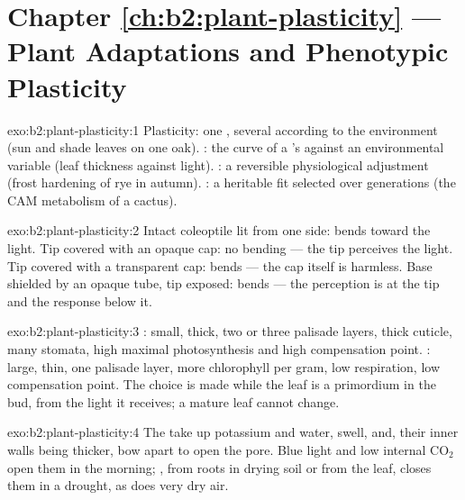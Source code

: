 \section*{Chapter \ref{ch:b2:plant-plasticity} --- Plant Adaptations and Phenotypic Plasticity}

\begin{solution}{exo:b2:plant-plasticity:1}
Plasticity: one , several  according to the
environment (sun and shade leaves on one oak). :
the curve of a 's  against an environmental
variable (leaf thickness against light). : a reversible
physiological adjustment (frost hardening of rye in autumn).
: a heritable fit selected over generations (the CAM
metabolism of a cactus).
\end{solution}

\begin{solution}{exo:b2:plant-plasticity:2}
Intact coleoptile lit from one side: bends toward the light. Tip
covered with an opaque cap: no bending --- the tip perceives the
light. Tip covered with a transparent cap: bends --- the cap itself
is harmless. Base shielded by an opaque tube, tip exposed: bends ---
the perception is at the tip and the response below it.
\end{solution}

\begin{solution}{exo:b2:plant-plasticity:3}
: small, thick, two or three palisade layers, thick
cuticle, many stomata, high maximal photosynthesis and high
compensation point. : large, thin, one palisade layer,
more chlorophyll per gram, low respiration, low compensation point.
The choice is made while the leaf is a primordium in the bud, from
the light it receives; a mature leaf cannot change.
\end{solution}

\begin{solution}{exo:b2:plant-plasticity:4}
The  take up potassium and water, swell, and, their
inner walls being thicker, bow apart to open the pore. Blue light
and low internal $\mathrm{CO_2}$ open them in the morning; , from roots in drying soil or from the leaf, closes them in a
drought, as does very dry air.
\end{solution}

